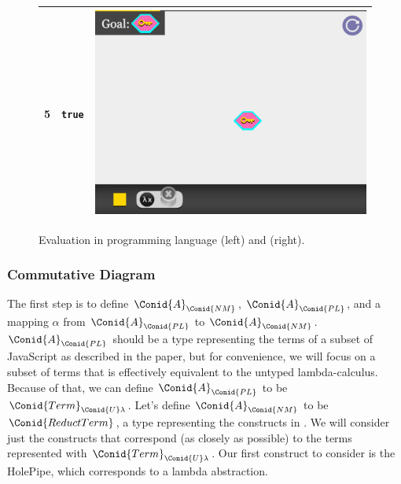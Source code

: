 \begin{figure}
\begin{tabular}{|l|p{4.5cm}|l|}
    5 & \verb|true|                                     & \includegraphics[scale=0.15]{images/reduct/lambda_xdot_x_x_-_y_eq_z_-_a_-_5.png} \\\hline
    \end{tabular}
    \caption{Evaluation in programming language (left) and  \nm{} (right).}
    \label{fig:reductA}
\end{figure}


\subsubsection{Commutative Diagram}
The first step is to define \ensuremath{\Conid{A}_{\Conid{NM}}}, \ensuremath{\Conid{A}_{\Conid{PL}}},
and a mapping $\alpha$ from \ensuremath{\Conid{A}_{\Conid{PL}}} to \ensuremath{\Conid{A}_{\Conid{NM}}}.
%
%
\ensuremath{\Conid{A}_{\Conid{PL}}} should be a type representing the terms of a subset of JavaScript as described in the paper,
but for convenience, we will focus on a subset of terms that is effectively equivalent to the untyped lambda-calculus.
Because of that, we can define \ensuremath{\Conid{A}_{\Conid{PL}}} to be \ensuremath{\Conid{Term}_{\Conid{U}\lambda}}.
%
Let's define \ensuremath{\Conid{A}_{\Conid{NM}}} to be \ensuremath{\Conid{ReductTerm}}, a type representing the constructs in .
We will consider just the constructs that correspond (as closely as possible) to the terms represented with \ensuremath{\Conid{Term}_{\Conid{U}\lambda}}.
%
%
%
Our first construct to consider is the 
HolePipe, which corresponds to a lambda abstraction.

